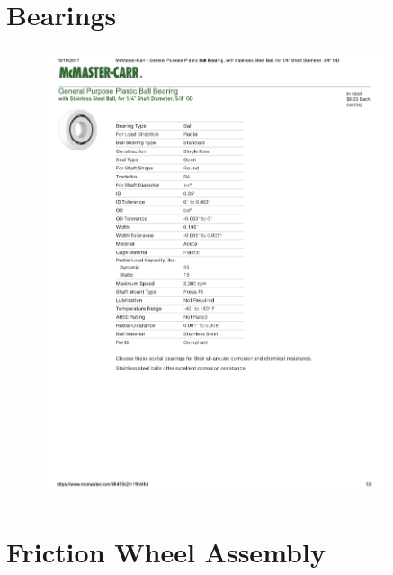 \documentclass[../main.tex]{subfiles}
\begin{document}
\section{Bearings \cite{PBEARINGS}} \label{PBearings}
\begin{figure}[H]
	\centering
	\includegraphics[width=0.9\textwidth]{img/specs//Bearing-Specs.pdf}
\end{figure}

\section{Friction Wheel Assembly}

\end{document}
